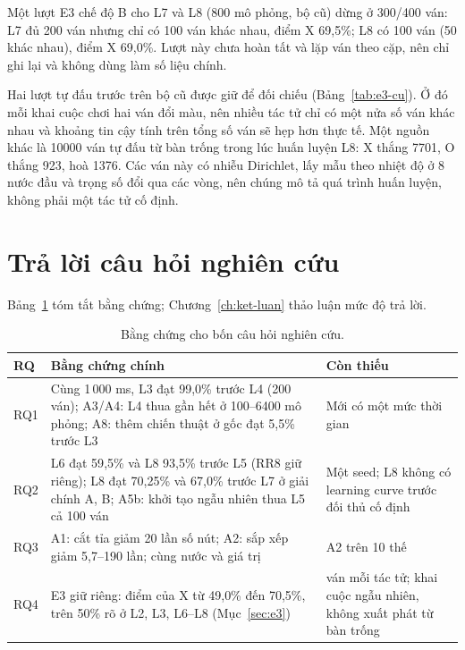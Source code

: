 Một lượt E3 chế độ B cho L7 và L8 (800 mô phỏng, bộ cũ) dừng ở 300/400 ván: L7 đủ 200 ván nhưng chỉ có 100 ván khác nhau, điểm X 69{,}5\%; L8 có 100 ván (50 khác nhau), điểm X 69{,}0\%. Lượt này chưa hoàn tất và lặp ván theo cặp, nên chỉ ghi lại và không dùng làm số liệu chính.


Hai lượt tự đấu trước trên bộ cũ được giữ để đối chiếu (Bảng~\ref{tab:e3-cu}). Ở đó mỗi khai cuộc chơi hai ván đổi màu, nên nhiều tác tử chỉ có một nửa số ván khác nhau và khoảng tin cậy tính trên tổng số ván sẽ hẹp hơn thực tế. Một nguồn khác là \num{10000} ván tự đấu từ bàn trống trong lúc huấn luyện L8: X thắng \num{7701}, O thắng 923, hoà \num{1376}. Các ván này có nhiễu Dirichlet, lấy mẫu theo nhiệt độ ở 8 nước đầu và trọng số đổi qua các vòng, nên chúng mô tả quá trình huấn luyện, không phải một tác tử cố định.


\section{Trả lời câu hỏi nghiên cứu}
Bảng~\ref{tab:tl-rq} tóm tắt bằng chứng; Chương~\ref{ch:ket-luan} thảo luận mức độ trả lời.

\begin{table}[H]
\centering\small
\caption{Bằng chứng cho bốn câu hỏi nghiên cứu.}
\label{tab:tl-rq}
\begin{tabularx}{\textwidth}{@{}l >{\raggedright\arraybackslash}X >{\raggedright\arraybackslash}p{}@{}}
\toprule
\textbf{RQ} & \textbf{Bằng chứng chính} & \textbf{Còn thiếu} \\
\midrule
RQ1 & Cùng 1\,000 ms, L3 đạt 99{,}0\% trước L4 (200 ván); A3/A4: L4 thua gần hết ở 100--6400 mô phỏng; A8: thêm chiến thuật ở gốc đạt 5{,}5\% trước L3 & Mới có một mức thời gian \\
RQ2 & L6 đạt 59{,}5\% và L8 93{,}5\% trước L5 (RR8 giữ riêng); L8 đạt 70{,}25\% và 67{,}0\% trước L7 ở giải chính A, B; A5b: khởi tạo ngẫu nhiên thua L5 cả 100 ván & Một seed; L8 không có learning curve trước đối thủ cố định \\
RQ3 & A1: cắt tỉa giảm 20 lần số nút; A2: sắp xếp giảm 5{,}7--190 lần; cùng nước và giá trị & A2 trên 10 thế \\
RQ4 & E3 giữ riêng: điểm của X từ 49{,}0\% đến 70{,}5\%, trên 50\% rõ ở L2, L3, L6--L8 (Mục~\ref{sec:e3}) & 100 ván mỗi tác tử; khai cuộc ngẫu nhiên, không xuất phát từ bàn trống \\
\bottomrule
\end{tabularx}
\end{table}

